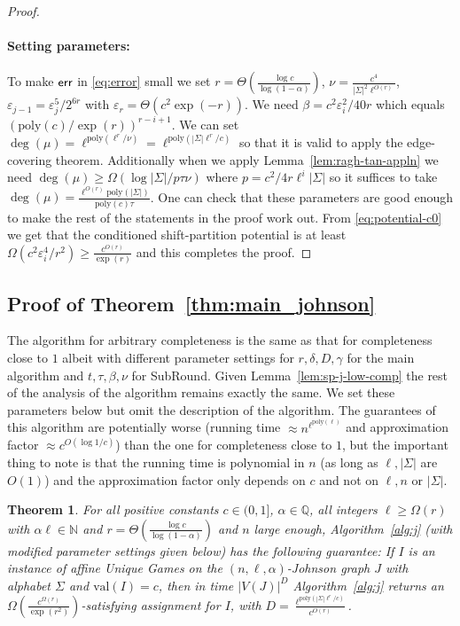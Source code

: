 \documentclass[11pt]{article}
\def \Q {{\mathbb Q}}
\def \N {\mathbb{N}}
\def \poly {\mathrm{poly}}
\def \eps {{\varepsilon}}
\def \val {\mathrm{val}}
\newtheorem{theorem}{Theorem}[section]
\theoremstyle{definition}
\begin{document}
\begin{proof}
\paragraph{Setting parameters:} To make $\sf{err}$ in \eqref{eq:error} small we set $r = \Theta(\frac{\log c}{\log(1-\alpha)})$, $\nu = \frac{c^4}{|\Sigma|^2\ell^{O(r)}}$, $\eps_{j-1} = \eps_j^5/2^{6r}$ with $\eps_r = \Theta(c^2\exp(-r))$. We need $\beta = c^2\eps_i^2/40r$ which equals $(\poly(c)/\exp(r))^{r-i+1}$. We can set $\deg(\mu) = \ell^{\poly(\ell^r/\nu)} = \ell^{\poly(|\Sigma|\ell^r/c)}$ so that it is valid to apply the edge-covering theorem. Additionally when we apply Lemma~\ref{lem:ragh-tan-appln} we need $\deg(\mu) \geq \Omega(\log |\Sigma|/p\tau\nu)$ where $p = c^2/4r\ell^i|\Sigma|$ so it suffices to take $\deg(\mu) = \frac{\ell^{O(r)}\poly(|\Sigma|)}{\poly(c)\tau}$. One can check that these parameters are good enough to make the rest of the statements in the proof work out. From \eqref{eq:potential-c0} we get that the conditioned shift-partition potential is at least $\Omega(c^2\eps_i^4/r^2) \geq \frac{c^{O(r)}}{\exp(r)}$ and this completes the proof.
\end{proof}


\subsection{Proof of Theorem~\ref{thm:main_johnson}}
The algorithm for arbitrary completeness is the same as that for completeness close to $1$ albeit with different parameter settings for $r, \delta,D,\gamma$ for the main algorithm and $t,\tau,\beta,\nu$ for SubRound. Given Lemma~\ref{lem:sp-j-low-comp} the rest of the analysis of the algorithm remains exactly the same. We set these parameters below but omit the description of the algorithm. The guarantees of this algorithm are potentially worse (running time $\approx n^{\ell^{\poly(\ell)}}$ and approximation factor $\approx c^{O(\log 1/c)}$) than the one for completeness close to $1$, but the important thing to note is that the running time is polynomial in $n$ (as long as $\ell, |\Sigma|$ are $O(1)$) and the approximation factor only depends on $c$ and not on $\ell,n$ or $|\Sigma|$.

\begin{theorem}\label{thm:main-johnson-arbit-comp}
For all positive constants $c \in (0,1]$, $\alpha \in \Q$, all integers $\ell \geq \Omega(r)$ with $\alpha \ell \in \N$ and $r =  \Theta(\frac{\log c}{\log(1-\alpha)})$ and $n$ large enough, Algorithm~\ref{alg:j} (with modified parameter settings given below) has the following guarantee: If $I$ is an instance of affine Unique Games on the $(n,\ell,\alpha)$-Johnson graph $J$ with alphabet $\Sigma$ and $\val(I) = c$, then in time $|V(J)|^{D}$ Algorithm~\ref{alg:j} returns an $\Omega\left(\frac{c^{\Omega(r)}}{\exp(r^2)}\right)$-satisfying assignment for $I$, with $D = \frac{\ell^{\poly(|\Sigma|\ell^r/c)}}{c^{O(r)}}$.
\end{theorem}
\end{document}
